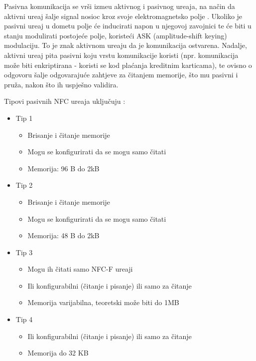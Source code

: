 Pasivna komunikacija se vr\v{s}i izme\dj u aktivnog i pasivnog ure\dj aja, na na\v{c}in da aktivni ure\dj aj \v{s}alje signal nosioc kroz svoje elektromagnetsko polje \cite{nfc_arhitektura}. Ukoliko je pasivni ure\dj aj u dometu polje \'{c}e inducirati napon u njegovoj zavojnici te \'{c}e biti u stanju modulirati postoje\'{c}e polje, koriste\'{c}i ASK (amplitude-shift keying) modulaciju. To je znak aktivnom ure\dj aju da je komunikacija ostvarena. Nadalje, aktivni ure\dj aj pita pasivni koju vrstu komunikacije koristi (npr. komunikacija mo\v{z}e biti enkriptirana - koristi se kod pla\'{c}anja kreditnim karticama), te ovisno o odgovoru \v{s}alje odgovaraju\'{c}e zahtjeve za \v{c}itanjem memorije, \v{s}to mu pasivni i pru\v{z}a, nakon \v{s}to ih uspje\v{s}no validira.



Tipovi pasivnih NFC ure\dj aja uklju\v{c}uju \cite{nfc_pasivni}:

\begin{itemize}
	\item Tip 1
	\begin{itemize}
		\item Brisanje i \v{c}itanje memorije
		\item Mogu se konfigurirati da se mogu samo \v{c}itati
		\item Memorija: 96 B do 2kB
	\end{itemize}

	\item Tip 2
	\begin{itemize}
		\item Brisanje i \v{c}itanje memorije
		\item Mogu se konfigurirati da se mogu samo \v{c}itati
		\item Memorija: 48 B do 2kB
	\end{itemize}

	\item Tip 3
	\begin{itemize}
		\item Mogu ih \v{c}itati samo NFC-F ure\dj aji
		\item Ili konfigurabilni (\v{c}itanje i pisanje) ili samo za \v{c}itanje
		\item  Memorija varijabilna, teoretski mo\v{z}e biti do 1MB
	\end{itemize}

	\item Tip 4
	\begin{itemize}
		\item Ili konfigurabilni (\v{c}itanje i pisanje) ili samo za \v{c}itanje
		\item Memorija do 32 KB
	\end{itemize}
\end{itemize}


